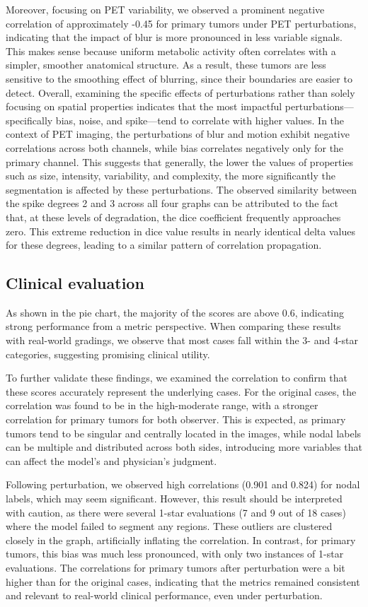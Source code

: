 Moreover, focusing on PET variability, we observed a prominent negative correlation of approximately -0.45 for primary tumors under PET perturbations, indicating that the impact of blur is more pronounced in less variable signals. 
This makes sense because uniform metabolic activity often correlates with a simpler, smoother anatomical structure. As a result, these tumors are less sensitive to the smoothing effect of blurring, since their boundaries are easier to detect. 
Overall, examining the specific effects of perturbations rather than solely focusing on spatial properties indicates that the most impactful perturbations—specifically bias, noise, and spike—tend to correlate with higher values. In the context of PET imaging, the perturbations of blur and motion exhibit negative correlations across both channels, while bias correlates negatively only for the primary channel. This suggests that generally, the lower the values of properties such as size, intensity, variability, and complexity, the more significantly the segmentation is affected by these perturbations.
The observed similarity between the spike degrees 2 and 3 across all four graphs can be attributed to the fact that, at these levels of degradation, the dice coefficient frequently approaches zero. This extreme reduction in dice value results in nearly identical delta values for these degrees, leading to a similar pattern of correlation propagation.

\newpage
\subsection{Clinical evaluation}
As shown in the pie chart, the majority of the scores are above 0.6, indicating strong performance from a metric perspective. When comparing these results with real-world gradings, we observe that most cases fall within the 3- and 4-star categories, suggesting promising clinical utility.

To further validate these findings, we examined the correlation to confirm that these scores accurately represent the underlying cases. For the original cases, the correlation was found to be in the high-moderate range, with a stronger correlation for primary tumors for both observer. This is expected, as primary tumors tend to be singular and centrally located in the images, while nodal labels can be multiple and distributed across both sides, introducing more variables that can affect the model's and physician's judgment.

Following perturbation, we observed high correlations (0.901 and 0.824) for nodal labels, which may seem significant. However, this result should be interpreted with caution, as there were several 1-star evaluations (7 and 9 out of 18 cases) where the model failed to segment any regions. These outliers are clustered closely in the graph, artificially inflating the correlation. In contrast, for primary tumors, this bias was much less pronounced, with only two instances of 1-star evaluations. The correlations for primary tumors after perturbation were a bit higher than for the original cases, indicating that the metrics remained consistent and relevant to real-world clinical performance, even under perturbation.

